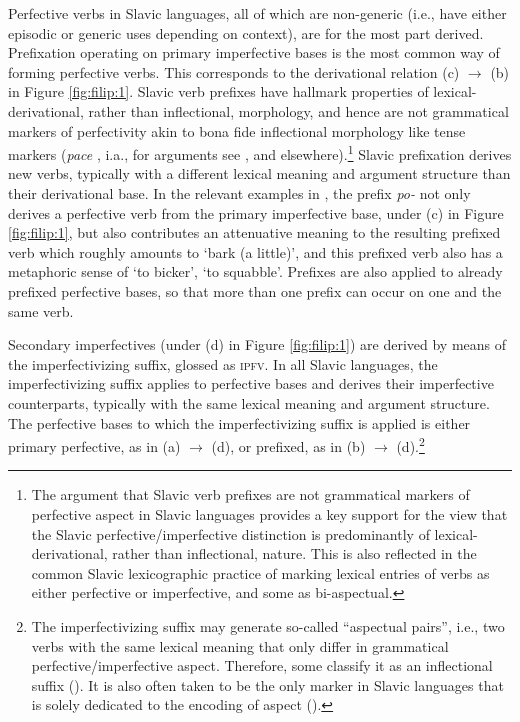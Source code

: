 \documentclass[output=paper,colorlinks,citecolor=brown]{langscibook}
\begin{document}
Perfective verbs in Slavic languages, all of which are non-generic (i.e., have either episodic or generic uses depending on context), are for the most part derived. Prefixation operating on primary imperfective bases is the most common way of forming perfective verbs. This corresponds to the derivational relation (c) $\rightarrow$ (b) in Figure \ref{fig:filip:1}.
Slavic verb prefixes 
have hallmark properties of lexical-derivational, rather than inflectional, morphology, and hence are not grammatical markers of perfectivity akin to bona fide inflectional morphology like tense markers (\textit{pace} \citealt{borer2005}, i.a., for arguments see \citealt{filip1992,filip2000quantization, Filip2026a}, and elsewhere).\footnote{The argument that Slavic verb prefixes are not grammatical markers of perfective aspect in Slavic languages provides a key support for the view that the Slavic perfective/imperfective distinction is predominantly of lexical-derivational, rather than inflectional, nature. This is also reflected in the common Slavic lexicographic practice of marking lexical entries of verbs as either perfective or imperfective, and some as bi-aspectual.} 
Slavic prefixation derives new verbs, typically with a different lexical meaning and argument structure than their derivational base. In the relevant examples in , the prefix \textit{po-} not only derives a perfective verb from the primary imperfective base, under (c) in Figure \ref{fig:filip:1}, but also contributes
an attenuative meaning to the resulting prefixed verb 
which roughly amounts to `bark (a little)',
and this prefixed verb also has a metaphoric sense of `to bicker', `to squabble'. Prefixes are also applied to already prefixed perfective bases, so that more than one prefix can occur on one and the same verb. 

Secondary imperfectives (under (d) in Figure \ref{fig:filip:1}) are derived by means of the imperfectivizing suffix, glossed as \textsc{ipfv}. 
In all Slavic languages, the imperfectivizing suffix applies to perfective bases and derives their imperfective counterparts, typically with the
same lexical meaning and argument structure. The perfective
bases to which the imperfectivizing suffix is applied is
either primary perfective, as in (a) $\rightarrow$ (d), or prefixed, as in (b) $\rightarrow$ (d).\footnote{The imperfectivizing suffix may generate so-called ``aspectual pairs'', i.e., two verbs with the same lexical meaning that only differ in grammatical perfective/imperfective aspect. Therefore, some classify it as an inflectional suffix (\citealt{Isacenko1960,filip1993phd,Filip1999}).
It is also often taken to be 
the only marker in Slavic languages that is solely dedicated to the encoding of aspect (\citealt{Isacenko1960,filip1993phd,Filip1999}).}
\end{document}
